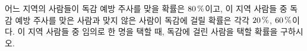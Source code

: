 어느 지역의 사람들이 독감 예방 주사를 맞을 확률은 $80\mkern3mu \%$이고, 이 지역 사람들 중 독감 예방 주사를 맞은 사람과 맞지 않은 사람이 독감에 걸릴 확률은 각각 $20\mkern3mu \%$, $60\mkern3mu \%$이다. 이 지역 사람들 중 임의로 한 명을 택할 때, 독감에 걸린 사람을 택할 확률을 구하시오.
